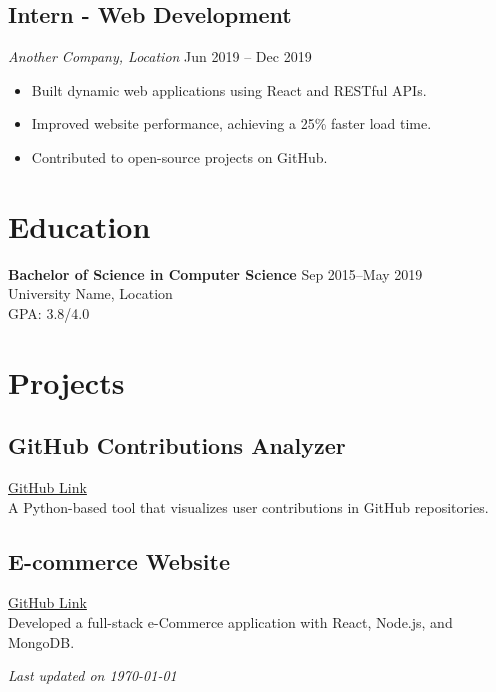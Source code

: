 \documentclass[a4paper,10pt]{article}
\begin{document}
\subsection*{Intern - Web Development}
\textit{Another Company, Location} \hfill Jun 2019 -- Dec 2019
\begin{itemize}[leftmargin=*]
    \item Built dynamic web applications using React and RESTful APIs.
    \item Improved website performance, achieving a 25\% faster load time.
    \item Contributed to open-source projects on GitHub.
\end{itemize}

\section*{Education}
\textbf{Bachelor of Science in Computer Science} \hfill Sep 2015--May 2019 \\
University Name, Location \\
GPA: 3.8/4.0

\section*{Projects}

\subsection*{GitHub Contributions Analyzer}
\href{https://github.com/yourusername/project1}{GitHub Link} \\
A Python-based tool that visualizes user contributions in GitHub repositories.

\subsection*{E-commerce Website}
\href{https://github.com/yourusername/project2}{GitHub Link} \\
Developed a full-stack e-Commerce application with React, Node.js, and MongoDB.

\vfill
\begin{center}
    {\small \textit{Last updated on \today}}
\end{center}
\end{document}
